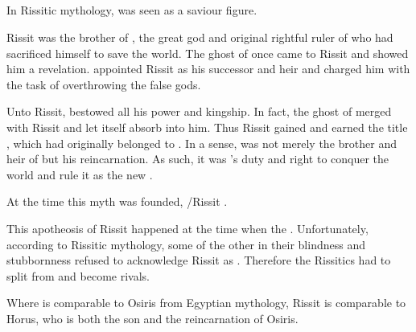 \subsection{\RissitNechsain}
In Rissitic mythology,  was seen as a saviour figure. 

Rissit was the brother of , the great god and original rightful ruler of \Miith who had sacrificed himself to save the world.
The ghost of \Mezzagrael once came to Rissit and showed him a revelation.
\Mezzagrael appointed Rissit as his successor and heir and charged him with the task of overthrowing the false gods. 

Unto Rissit, \Mezzagrael bestowed all his power and kingship. 
In fact, the ghost of \Mezzagrael merged with Rissit and let itself absorb into him. 
Thus Rissit gained and earned the title \Nechsain, which had originally belonged to \Mezzagrael. 
In a sense, \Nechsain was not merely the brother and heir of \Mezzagrael but his reincarnation. 
As such, it was \Nechsain's duty and right to conquer the world and rule it as the new \Mezzagrael. 

At the time this myth was founded, \Secherdamon/Rissit . 

This apotheosis of Rissit happened at the time when the . 
Unfortunately, according to Rissitic mythology, some of the other \taorthae in their blindness and stubbornness refused to acknowledge Rissit as \Nechsain.
Therefore the Rissitics had to split from \Ortaica and become rivals.

Where \Mezzagrael is comparable to Osiris from Egyptian mythology, Rissit is comparable to Horus, who is both the son and the reincarnation of Osiris. 



